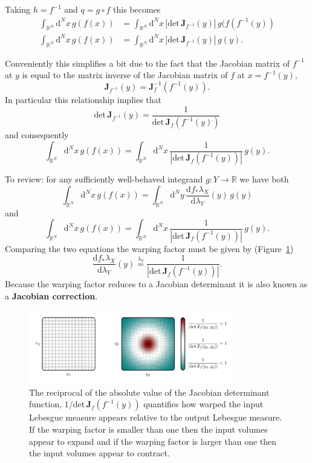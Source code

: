 \documentclass[
  letterpaper,
  DIV=11,
  numbers=noendperiod]{scrartcl}
\begin{document}
Taking \(h = f^{-1}\) and \(q = g \circ f\) this becomes \begin{align*}
\int_{\mathbb{R}^{N}} \mathrm{d}^{N} x \, g(f(x))
&=
\int_{\mathbb{R}^{N}} \mathrm{d}^{N} x \,
| \mathrm{det} \,  \mathbf{J}_{f^{-1}}(y) | \, g(f(f^{-1}(y))
\\
\int_{\mathbb{R}^{N}} \mathrm{d}^{N} x \, g(f(x))
&=
\int_{\mathbb{R}^{N}} \mathrm{d}^{N} x \,
| \mathrm{det} \,  \mathbf{J}_{f^{-1}}(y) | \, g(y).
\end{align*}

Conveniently this simplifies a bit due to the fact that the Jacobian
matrix of \(f^{-1}\) at \(y\) is equal to the matrix inverse of the
Jacobian matrix of \(f\) at \(x = f^{-1}(y)\), \[
\mathbf{J}_{f^{-1}}(y) = \mathbf{J}^{-1}_{f}(f^{-1}(y)).
\] In particular this relationship implies that \[
\mathrm{det} \,  \mathbf{J}_{f^{-1}}(y)
=
\frac{1}{ \mathrm{det} \,  \mathbf{J}_{f}(f^{-1}(y)) }
\] and consequently \[
\int_{\mathbb{R}^{N}} \mathrm{d}^{N} x \, g(f(x))
=
\int_{\mathbb{R}^{N}} \mathrm{d}^{N} x \,
\frac{1}{ | \mathrm{det} \,  \mathbf{J}_{f}(f^{-1}(y)) | } \, g(y).
\]

To review: for any sufficiently well-behaved integrand
\(g : Y \rightarrow \mathbb{R}\) we have both \[
\int_{\mathbb{R}^{N}} \mathrm{d}^{N} x \, g(f(x))
=
\int_{\mathbb{R}^{N}} \mathrm{d}^{N} y \,
\frac{ \mathrm{d} f_{*} \lambda_{X} }{ \mathrm{d} \lambda_{Y}}(y) \,
g(y)
\] and \[
\int_{\mathbb{R}^{N}} \mathrm{d}^{N} x \, g(f(x))
=
\int_{\mathbb{R}^{N}} \mathrm{d}^{N} x \,
\frac{1}{ | \mathrm{det} \, \mathbf{J}_{f}(f^{-1}(y)) |} \, g(y).
\] Comparing the two equations the warping factor must be given by
(Figure~\ref{fig-warping}) \[
\frac{ \mathrm{d} f_{*} \lambda_{X} }{ \mathrm{d} \lambda_{Y}}(y)
\overset{\lambda_{Y}}{=}
\frac{1}{ | \mathrm{det} \, \mathbf{J}_{f}(f^{-1}(y)) |}.
\] Because the warping factor reduces to a Jacobian determinant it is
also known as a \textbf{Jacobian correction}.

\begin{figure}

{\centering \includegraphics[width=0.8\textwidth,height=\textheight]{figures/warping/warping.pdf}

}

\caption{\label{fig-warping}The reciprocal of the absolute value of the
Jacobian determinant function,
\(1 / \mathrm{det} \, \mathbf{J}_{f}(f^{-1}(y))\) quantifies how warped
the input Lebesgue measure appears relative to the output Lebesgue
measure. If the warping factor is smaller than one then the input
volumes appear to expand and if the warping factor is larger than one
then the input volumes appear to contract.}

\end{figure}
\end{document}
